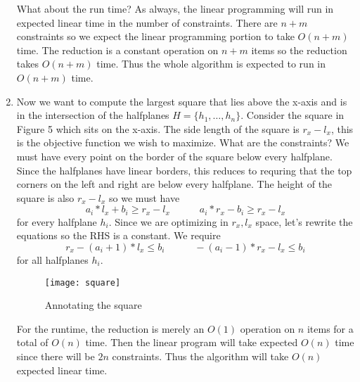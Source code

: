 \documentclass[11pt]{article}
\begin{document}
\begin{enumerate}
    What about the run time?
    As always, the linear programming will run in expected linear time in the number of constraints.
    There are $n+m$ constraints so we expect the linear programming portion to take $O(n+m)$ time.
    The reduction is a constant operation on $n+m$ items so the reduction takes $O(n+m)$ time.
    Thus the whole algorithm is expected to run in $O(n+m)$ time.

    \item Now we want to compute the largest square that lies above the x-axis and is in the intersection of the halfplanes $H = \{ h_1, \ldots, h_n \}$.
    Consider the square in Figure 5 which sits on the x-axis.
    The side length of the square is $r_x - l_x$, this is the objective function we wish to maximize.
    What are the constraints?
    We must have every point on the border of the square below every halfplane.
    Since the halfplanes have linear borders, this reduces to requring that the top corners on the left and right are below every halfplane.
    The height of the square is also $r_x - l_x$ so we must have
    $$ a_i*l_x + b_i \geq r_x - l_x \hspace{3em} a_i*r_x - b_i \geq r_x - l_x $$
    for every halfplane $h_i$.
    Since we are optimizing in $r_x, l_x$ space, let's rewrite the equations so the RHS is a constant.
    We require
    $$ r_x - (a_i + 1)*l_x \leq b_i \hspace{3em} -(a_i - 1)*r_x - l_x \leq b_i $$
    for all halfplanes $h_i$.

    \begin{figure}[h]
        \centering
        \texttt{[image: square]}
        \label{fig:square}
        \caption{Annotating the square}
    \end{figure}

    \newpage
    For the runtime, the reduction is merely an $O(1)$ operation on $n$ items for a total of $O(n)$ time.
    Then the linear program will take expected $O(n)$ time since there will be $2n$ constraints.
    Thus the algorithm will take $O(n)$ expected linear time.

\end{enumerate}
\end{document}
